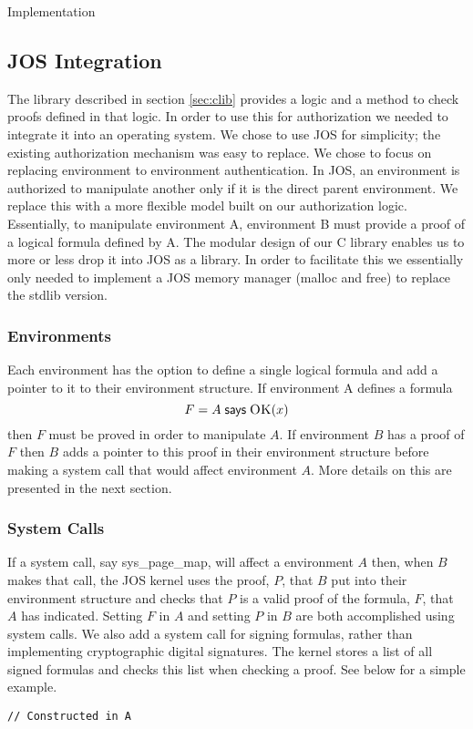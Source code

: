 \documentclass[10pt]{article}
\newcommand{\says}[2]{\ensuremath{#1\;\textsf{says}\;#2}}
\newcommand{\pred}[2]{\ensuremath{\textsc{#1}(#2)}}
\begin{document}
\begin{section}{Implementation}
\subsection{JOS Integration}
The library described in section \ref{sec:clib} provides a logic and a method to check proofs defined in that logic.  In order to use this for authorization we needed to integrate it into an operating system.  We chose to use JOS for simplicity; the existing authorization mechanism was easy to replace.  We chose to focus on replacing environment to environment authentication.  In JOS, an environment is authorized to manipulate another only if it is the direct parent environment. We replace this with a more flexible model built on our authorization logic.  Essentially, to manipulate environment A, environment B must provide a proof of a logical formula defined by A.  The modular design of our C library enables us to more or less drop it into JOS as a library.  In order to facilitate this we essentially only needed to implement a JOS memory manager (\textsf{malloc} and \textsf{free}) to replace the \textsf{stdlib} version.
\subsubsection{Environments}
Each environment has the option to define a single logical formula and add a pointer to it to their environment structure.  If environment A defines a formula
\[
F = \says{A}{\pred{OK}{x}}
\]
then $F$ must be proved in order to manipulate $A$.  If environment $B$ has a proof of $F$ then $B$ adds a pointer to this proof in their environment structure before making a system call that would affect environment $A$.  More details on this are presented in the next section.
\subsubsection{System Calls}
If a system call, say \textsf{sys\_page\_map}, will affect a environment $A$ then, when $B$ makes that call, the JOS kernel uses the proof, $P$, that $B$ put into their environment structure and checks that $P$ is a valid proof of the formula, $F$, that $A$ has indicated.  Setting $F$ in $A$ and setting $P$ in $B$ are both accomplished using system calls.  We also add a system call for signing formulas, rather than implementing cryptographic digital signatures.  The kernel stores a list of all signed formulas and checks this list when checking a proof.  See below for a simple example.
\begin{lstlisting}
// Constructed in A


\end{lstlisting}
\end{section}
\end{document}
